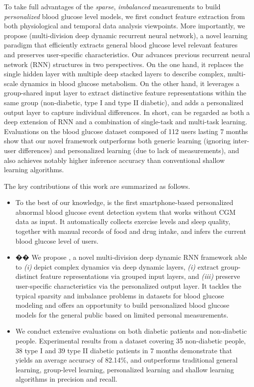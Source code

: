To take full advantages of the \emph{sparse}, \emph{imbalanced} measurements to build \emph{personalized} blood glucose level models, we first conduct feature extraction from both physiological and temporal data analysis viewpoints. More importantly, we propose \modelname (multi-division deep dynamic recurrent neural network), a novel learning paradigm that efficiently extracts general blood glucose level relevant features and preserves user-specific characteristics.
Our \modelname advances previous recurrent neural network (RNN) structures in two perspectives.
On the one hand, it replaces the single hidden layer with multiple deep stacked layers to describe complex, multi-scale dynamics in blood glucose metabolism.
On the other hand, it leverages a group-shared input layer to extract distinctive feature representations within the same group (\ie non-diabetic, type I and type II diabetic), and adds a personalized output layer to capture individual differences.
In short, \modelname can be regarded as both a deep extension of RNN and a combination of single-task and multi-task learning.
Evaluations on the blood glucose dataset composed of 112 users lasting 7 months show that our novel \modelname framework outperforms both generic learning (\ie ignoring inter-user differences) and personalized learning (due to lack of measurements), and also achieves notably higher inference accuracy than conventional shallow learning algorithms.

The key contributions of this work are summarized as follows.
\begin{itemize}
  \item
  To the best of our knowledge, \sysname is the first smartphone-based personalized abnormal blood glucose event detection system that works without CGM data as input.
  It automatically collects exercise levels and sleep quality, together with manual records of food and drug intake, and infers the current blood glucose level of users.
  \item��
  We propose \modelname, a novel multi-division deep dynamic RNN framework able to \emph{(i)} depict complex dynamics via deep dynamic layers, \emph{(i)} extract group-distinct feature representations via grouped input layers, and \emph{(iii)} preserve user-specific characteristics via the personalized output layer.
  It tackles the typical sparsity and imbalance problems in datasets for blood glucose modeling and offers an opportunity to build personalized blood glucose models for the general public based on limited personal measurements.
  \item
  We conduct extensive evaluations on both diabetic patients and non-diabetic people.
  Experimental results from a dataset covering 35 non-diabetic people, 38 type I and 39 type II diabetic patients in 7 months demonstrate that \sysname yields an average accuracy of 82.14\%, and outperforms traditional general learning, group-level learning, personalized learning and shallow learning algorithms in precision and recall.
\end{itemize}

